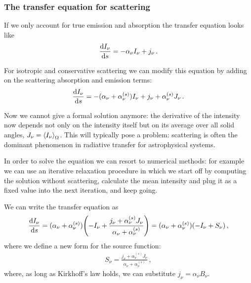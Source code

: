 \documentclass[main.tex]{subfiles}
\begin{document}
\subsubsection{The transfer equation for scattering}


If we only account for true emission and absorption the transfer equation looks like 
%
\begin{align}
\dv{I_\nu }{s} = - \alpha_{\nu } I_\nu + j_\nu 
\,.
\end{align}

For isotropic and conservative scattering we can modify this equation by adding on the scattering absorption and emission terms: 
%
\begin{align}
\dv{I_\nu }{s} = - (\alpha_{\nu } + \alpha_{\nu }^{(s)}) I_\nu + j_\nu + \alpha_{\nu }^{(s)} J_\nu 
\,.
\end{align}

Now we cannot give a formal solution anymore: the derivative of the intensity now depends not only on the intensity itself but on its average over all solid angles, \(J_\nu  = \expval{I_\nu }_{\Omega }\).
This will typically pose a problem: scattering is often the dominant phenomenon in radiative transfer for astrophysical systems. 

In order to solve the equation we can resort to numerical methods: for example we can use an iterative relaxation procedure in which we start off by computing the solution without scattering, calculate the mean intensity and plug it as a fixed value into the next iteration, and keep going. 

We can write the transfer equation as 
%
\begin{align}
\dv{I_\nu }{ s} 
= (\alpha_{\nu } + \alpha_{\nu }^{(s)}) 
\qty(- I_\nu + \frac{j_\nu + \alpha_{\nu }^{(s)} J_\nu }{\alpha_{\nu } + \alpha_{\nu }^{(s)}}) 
= (\alpha_{\nu } + \alpha_{\nu }^{(s)}) 
\qty(-I_\nu  + S_\nu )
\,,
\end{align}
%
where we define a new form for the source function: 
%
\begin{align} \label{eq:source-function-with-scattering}
S_\nu = \frac{j_\nu + \alpha_{\nu }^{(s)} J_\nu }{\alpha_{\nu } + \alpha_{\nu }^{(s)}}  
\,,
\end{align}
%
where, as long as Kirkhoff's law holds, we can substitute \(j_\nu = \alpha_{\nu } B_\nu \). 
\end{document}
